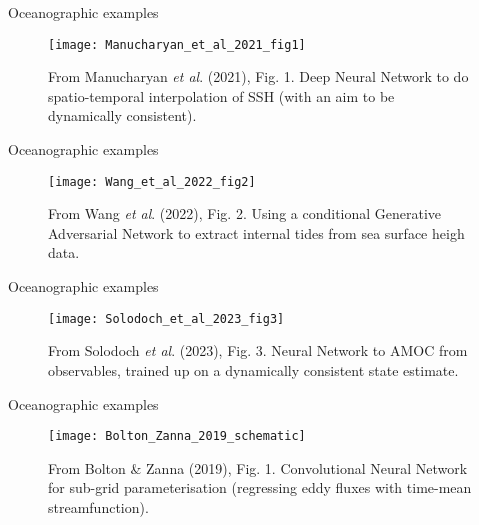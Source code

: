 \documentclass[xcolor=x11names,compress]{beamer}
\renewcommand{\(}{\begin{columns}}
\renewcommand{\)}{\end{columns}}
\newcommand{\<}[1]{\begin{column}{#1}}
\renewcommand{\>}{\end{column}}
\begin{document}

\begin{frame}{Oceanographic examples}

\begin{figure}
  \texttt{[image: Manucharyan\_et\_al\_2021\_fig1]}
  \caption{From Manucharyan \emph{et al}. (2021), Fig. 1. Deep Neural Network to
  do spatio-temporal interpolation of SSH (with an aim to be dynamically
  consistent).}
\end{figure}

\end{frame}


\begin{frame}{Oceanographic examples}

\begin{figure}
  \texttt{[image: Wang\_et\_al\_2022\_fig2]}
  \caption{From Wang \emph{et al}. (2022), Fig. 2. Using a conditional
  Generative Adversarial Network to extract internal tides from sea surface
  heigh data.}
\end{figure}

\end{frame}


\begin{frame}{Oceanographic examples}

\begin{figure}
  \texttt{[image: Solodoch\_et\_al\_2023\_fig3]}
  \caption{From Solodoch \emph{et al}. (2023), Fig. 3. Neural Network to AMOC
  from observables, trained up on a dynamically consistent state estimate.}
\end{figure}

\end{frame}


\begin{frame}{Oceanographic examples}

\begin{figure}
  \texttt{[image: Bolton\_Zanna\_2019\_schematic]}
  \caption{From Bolton \& Zanna (2019), Fig. 1. Convolutional Neural
  Network for sub-grid parameterisation (regressing eddy fluxes with time-mean
  streamfunction).}
\end{figure}

\end{frame}
\end{document}
